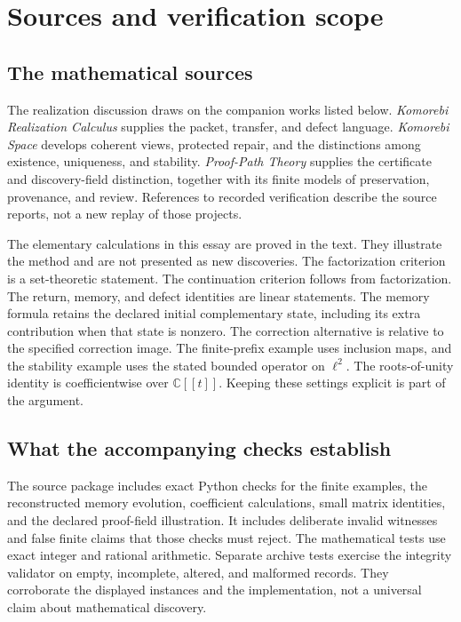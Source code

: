 \section*{Sources and verification scope}

\subsection*{The mathematical sources}
The realization discussion draws on the companion works listed below. \emph{Komorebi Realization Calculus} supplies the packet, transfer, and defect language. \emph{Komorebi Space} develops coherent views, protected repair, and the distinctions among existence, uniqueness, and stability. \emph{Proof-Path Theory} supplies the certificate and discovery-field distinction, together with its finite models of preservation, provenance, and review. References to recorded verification describe the source reports, not a new replay of those projects.

The elementary calculations in this essay are proved in the text. They illustrate the method and are not presented as new discoveries. The factorization criterion is a set-theoretic statement. The continuation criterion follows from factorization. The return, memory, and defect identities are linear statements. The memory formula retains the declared initial complementary state, including its extra contribution when that state is nonzero. The correction alternative is relative to the specified correction image. The finite-prefix example uses inclusion maps, and the stability example uses the stated bounded operator on \(\ell^2\). The roots-of-unity identity is coefficientwise over \(\mathbb C[[t]]\). Keeping these settings explicit is part of the argument.

\subsection*{What the accompanying checks establish}
The source package includes exact Python checks for the finite examples, the reconstructed memory evolution, coefficient calculations, small matrix identities, and the declared proof-field illustration. It includes deliberate invalid witnesses and false finite claims that those checks must reject. The mathematical tests use exact integer and rational arithmetic. Separate archive tests exercise the integrity validator on empty, incomplete, altered, and malformed records. They corroborate the displayed instances and the implementation, not a universal claim about mathematical discovery.

